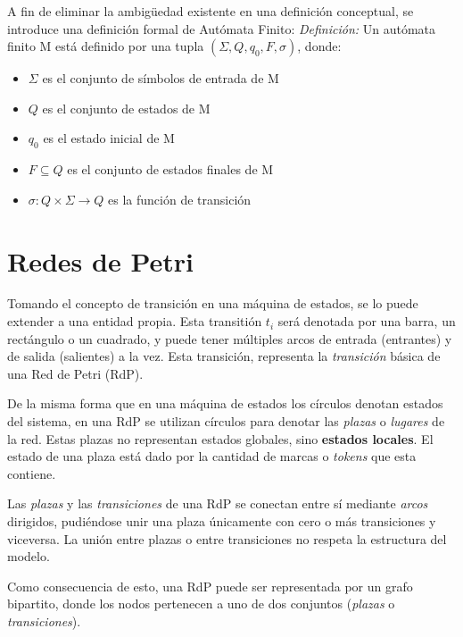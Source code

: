 A fin de eliminar la ambigüedad existente en una definición conceptual, se
introduce una definición formal de Autómata Finito:
\newline\newline\emph{Definición:} Un autómata finito M está definido por una
tupla $(\Sigma, Q, q_{0}, F, \sigma)$, donde:
\begin{itemize}    
  \item $\Sigma$ es el conjunto de símbolos de entrada de M
  \item $Q$ es el conjunto de estados de M
  \item $q_{0}$ es el estado inicial de M
  \item $F \subseteq Q$ es el conjunto de estados finales de M
  \item $\sigma : Q  \times \Sigma \rightarrow Q$ es la función de
  transición
\end{itemize} \cite{FSM_Wright}

\section{Redes de Petri}

Tomando el concepto de transición en una máquina de estados, se lo puede
extender a una entidad propia.
Esta transitión $t_{i}$ será denotada por una barra, un rectángulo o un
cuadrado, y puede tener múltiples arcos de entrada (entrantes) y de salida
(salientes) a la vez. Esta transición, representa la \textit{transición} básica
de una Red de Petri (RdP).\cite{PetriNetsFundamentals}

De la misma forma que en una máquina de estados los círculos denotan estados
del sistema, en una RdP se utilizan círculos para denotar las \textit{plazas} o
\textit{lugares} de la red. Estas plazas no representan estados globales, sino
\textbf{estados locales}. \cite{PetriNetsFundamentals} El estado de una plaza
está dado por la cantidad de marcas o \textit{tokens} que esta contiene.

Las \textit{plazas} y las \textit{transiciones} de una RdP se conectan entre sí
mediante \textit{arcos} dirigidos, pudiéndose unir una plaza únicamente con cero
o más transiciones y viceversa. La unión entre plazas o entre transiciones no
respeta la estructura del modelo.

Como consecuencia de esto, una RdP puede ser representada por un grafo
bipartito, donde los nodos pertenecen a uno de dos conjuntos (\textit{plazas} o
\textit{transiciones}).

